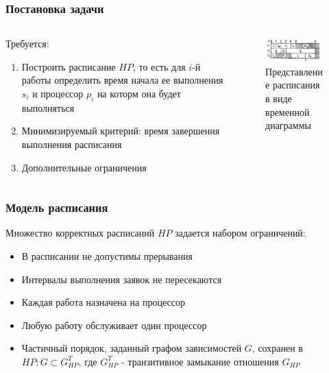 \documentclass[hyperref=unicode, aspectratio=169]{beamer}
\begin{document}
\begin{frame}
    \frametitle{Постановка задачи}
    \begin{columns}
        \begin{column}{0.6\textwidth}
            Требуется:
            \begin{enumerate}
                \item Построить расписание $HP$, то есть для $i$-й работы определить время начала ее выполнения $s_i$ и процессор $p_i$ на которм она будет выполняться
                \item Минимизируемый критерий: время завершения выполнения расписания
                \item Дополнительные ограничения
            \end{enumerate}
        \end{column}
        \begin{column}{0.4\textwidth}
            \begin{figure}
                \includegraphics[width=\textwidth]{imgs/schedule.png}
                \captionsetup{labelformat=empty}
                \caption{\small Представление расписания в виде временной диаграммы}
            \end{figure}
        \end{column}
    \end{columns}
\end{frame}

\begin{frame}
    \frametitle{Модель расписания}
    Множество корректных расписаний $HP$ задается набором ограничений:
    \begin{itemize}
        \item В расписании не допустимы прерывания
        \item Интервалы выполнения заявок не пересекаются
        \item Каждая работа назначена на процессор
        \item Любую работу обслуживает один процессор
        \item Частичный порядок, заданный графом зависимостей $G$, сохранен в $HP: G \subset G_{HP}^T$, где $G_{HP}^T$ - транзитивное замыкание отношения $G_{HP}$
    \end{itemize}
\end{frame}
\end{document}
